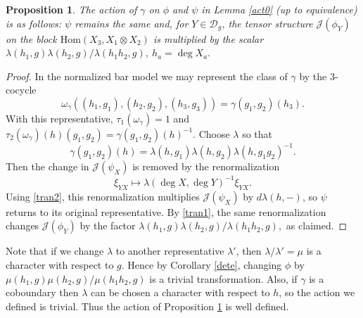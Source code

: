 \documentclass[12pt]{amsart}
\numberwithin{equation}{section}
\newtheorem{proposition}[theorem]{Proposition}
\theoremstyle{definition}
\newcommand{\Hom}{\text{Hom}}
\newcommand{\1}{_{(1)}}
\newcommand{\2}{_{(2)}}
\newcommand{\3}{_{(3)}}
\newcommand{\4}{_{(4)}}
\newcommand{\5}{_{(5)}}
\newcommand{\6}{_{(6)}}
\theoremstyle{plain}
\theoremstyle{definition}
\theoremstyle{remark}
\def\D{\mathcal{D}}
\def\Hom{\mathrm{Hom}}
\begin{document}
\begin{proposition}\label{act} The action of $\gamma$ on $\phi$ and $\psi$ in Lemma \ref{act0} (up to equivalence) is as follows: 
$\psi$ remains the same and, for $Y\in \D_g$, the tensor structure $\mathcal J(\phi_Y)$ on the block $\Hom(X_3,X_1\otimes X_2)$ is multiplied by the scalar 
$\lambda(h_1,g)\lambda(h_2,g)/\lambda(h_1h_2,g),\ h_a=\deg X_a.$
\end{proposition} 

\begin{proof}
In the normalized bar model we may represent the class of $\gamma$ by the $3$-cocycle
\[
        \omega_\gamma((h_1,g_1),(h_2,g_2),(h_3,g_3))=\gamma(g_1,g_2)(h_3).
\]
With this representative, $\tau_1(\omega_\gamma)=1$ and
$\tau_2(\omega_\gamma)(h)(g_1,g_2)=\gamma(g_1,g_2)(h)^{-1}$.
Choose $\lambda$ so that
\[
        \gamma(g_1,g_2)(h)=\lambda(h,g_1)\lambda(h,g_2)\lambda(h,g_1g_2)^{-1}.
\]
Then the change in $\mathcal J(\psi_X)$ is removed by the renormalization
$$
        \xi_{YX}\mapsto \lambda(\deg X,\deg Y)^{-1}\xi_{YX}.
$$
Using \eqref{tran2}, this renormalization multiplies $\mathcal J(\psi_X)$ by $d\lambda(h,-)$, so $\psi$ returns to its original representative.  By \eqref{tran1}, the same renormalization changes $\mathcal J(\phi_Y)$ by the factor
$
        \lambda(h_1,g)\lambda(h_2,g)/\lambda(h_1h_2,g),
$
as claimed.
\end{proof} 

Note that if we change $\lambda$ to another representative $\lambda'$, then $\lambda/\lambda'=\mu$ is a character with 
respect to $g$. Hence by Corollary \ref{dete}, changing $\phi$ by $\mu(h_1,g)\mu(h_2,g)/\mu(h_1h_2,g)$
is a trivial transformation. 
Also, if $\gamma$ is a coboundary
then $\lambda$ can be chosen a character with respect to $h$, so the action we defined is trivial.  
Thus the action of Proposition \ref{act} is well defined.  
\end{document}
